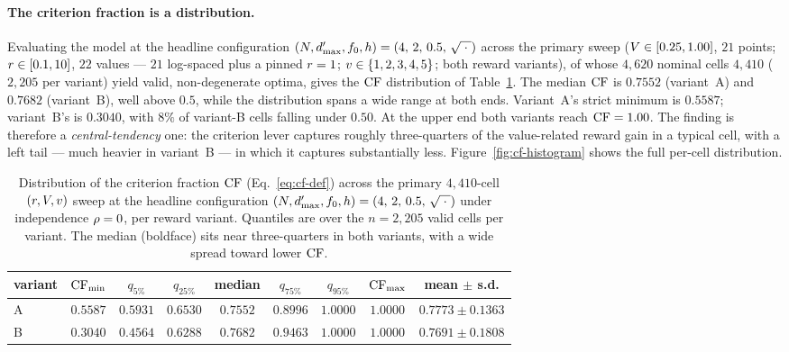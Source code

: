 \paragraph{The criterion fraction is a distribution.}
Evaluating the model at the headline configuration
$(N, d'_{\max}, f_0, h) = (4,\,2,\,0.5,\,\sqrt{\;\cdot\;})$ across
the primary sweep ($V \in [0.25, 1.00]$, $21$ points;
$r \in [0.1, 10]$, $22$ values --- $21$ log-spaced plus a pinned
$r = 1$; $v \in \{1,2,3,4,5\}$; both reward variants), of whose
$4{,}620$ nominal cells $4{,}410$ ($2{,}205$ per variant) yield valid,
non-degenerate optima, gives the $\mathrm{CF}$
distribution of Table~\ref{tab:cf-distribution}. The median $\mathrm{CF}$ is
$0.7552$ (variant~A) and $0.7682$ (variant~B), well above $0.5$, while
the distribution spans a wide range at both ends. Variant~A's strict
minimum is $0.5587$; variant~B's is $0.3040$, with $8\%$ of variant-B
cells falling under $0.50$. At the upper end both variants reach
$\mathrm{CF} = 1.00$. The finding is therefore a \emph{central-tendency} one:
the criterion lever captures roughly three-quarters of the
value-related reward gain in a typical cell, with a left tail --- much
heavier in variant~B --- in which it captures substantially less.
Figure~\ref{fig:cf-histogram} shows the full per-cell distribution.

\begin{table}[t]
  \centering
  \small
  \begin{tabular}{l c c c c c c c c}
    \toprule
    variant & $\mathrm{CF}_{\min}$ & $q_{5\%}$ & $q_{25\%}$ & median &
    $q_{75\%}$ & $q_{95\%}$ & $\mathrm{CF}_{\max}$ & mean $\pm$ s.d.\\
    \midrule
    A & $0.5587$ & $0.5931$ & $0.6530$ & $\mathbf{0.7552}$
      & $0.8996$ & $1.0000$ & $1.0000$
      & $0.7773 \pm 0.1363$\\
    B & $\mathbf{0.3040}$ & $0.4564$ & $0.6288$ & $\mathbf{0.7682}$
      & $0.9463$ & $1.0000$ & $1.0000$
      & $0.7691 \pm 0.1808$\\
    \bottomrule
  \end{tabular}
  \caption{Distribution of the criterion fraction $\mathrm{CF}$
  (Eq.~\ref{eq:cf-def}) across the primary $4{,}410$-cell
  $(r, V, v)$ sweep at the headline configuration
  $(N, d'_{\max}, f_0, h) = (4,\,2,\,0.5,\,\sqrt{\;\cdot\;})$ under
  independence $\rho = 0$, per reward variant. Quantiles are over
  the $n = 2{,}205$ valid cells per variant. The median (boldface) sits
  near three-quarters in both variants, with a wide spread toward lower
  $\mathrm{CF}$.}
  \label{tab:cf-distribution}
\end{table}

